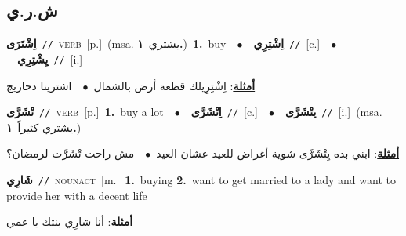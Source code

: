 \documentclass[10pt,a4paper,twoside]{article} %
\begin{document}
\begin{multicols}{2}
\vspace{-3mm}
\subsection*{\color{blue}\foreignlanguage{arabic}{ش.ر.ي}\color{blue}{}} 

{\setlength\topsep{0pt}\textbf{\foreignlanguage{arabic}{اِشْتَرَى}}\ {\color{gray}\texttt{//}\color{black}}\ \textsc{verb}\ [p.]\ \color{gray}(msa. \foreignlanguage{arabic}{يشتري}~\foreignlanguage{arabic}{\textbf{١.}})\color{black}\ \textbf{1.}~buy\ \ $\bullet$\ \ \setlength\topsep{0pt}\textbf{\foreignlanguage{arabic}{اِشْتِرِي}}\ {\color{gray}\texttt{//}\color{black}}\ [c.]\ \ $\bullet$\ \ \setlength\topsep{0pt}\textbf{\foreignlanguage{arabic}{يِشْتِرِي}}\ {\color{gray}\texttt{//}\color{black}}\ [i.]\  \begin{flushright}\color{gray}\foreignlanguage{arabic}{\textbf{\underline{\foreignlanguage{arabic}{أمثلة}}}: اِشْتِرِيلك قظعة أرض بالشمال\ $\bullet$\ \  اشترينا دحاريج}\end{flushright}\color{black}} \vspace{2mm}

{\setlength\topsep{0pt}\textbf{\foreignlanguage{arabic}{تْشَرَّى}}\ {\color{gray}\texttt{//}\color{black}}\ \textsc{verb}\ [p.]\ \textbf{1.}~buy a lot\ \ $\bullet$\ \ \setlength\topsep{0pt}\textbf{\foreignlanguage{arabic}{اِتْشَرَّى}}\ {\color{gray}\texttt{//}\color{black}}\ [c.]\ \ $\bullet$\ \ \setlength\topsep{0pt}\textbf{\foreignlanguage{arabic}{يتْشَرَّى}}\ {\color{gray}\texttt{//}\color{black}}\ [i.]\ \color{gray}(msa. \foreignlanguage{arabic}{يشتري كثيراً}~\foreignlanguage{arabic}{\textbf{١.}})\color{black}\  \begin{flushright}\color{gray}\foreignlanguage{arabic}{\textbf{\underline{\foreignlanguage{arabic}{أمثلة}}}: ابني بده يِتْشَرَّى شوية أغراض للعيد عشان العيد\ $\bullet$\ \  مش راحت تْشَرَّت لرمضان؟}\end{flushright}\color{black}} \vspace{2mm}

{\setlength\topsep{0pt}\textbf{\foreignlanguage{arabic}{شَارِي}}\ {\color{gray}\texttt{//}\color{black}}\ \textsc{noun\textunderscore act}\ [m.]\ \textbf{1.}~buying  \textbf{2.}~want to get married to a lady and want to provide her with a decent life\  \begin{flushright}\color{gray}\foreignlanguage{arabic}{\textbf{\underline{\foreignlanguage{arabic}{أمثلة}}}: أنا شارِي بنتك يا عمي}\end{flushright}\color{black}} \vspace{2mm}


\end{multicols}
\end{document}

